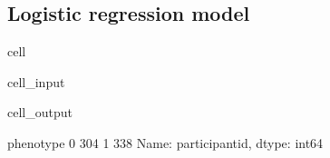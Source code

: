 \documentclass[letterpaper,10pt,english]{jupyterBook}
\begin{document}
\subsection{Logistic regression model}
\label{\detokenize{Cooper:id7}}
\begin{sphinxuseclass}{cell}\begin{sphinxVerbatimInput}

\begin{sphinxuseclass}{cell_input}
\begin{sphinxVerbatim}[commandchars=\\\{\}]
  \PYG{p}{[}\PYG{p}{]}
  \PYG{p}{[}\PYG{p}{[}\PYG{p}{]}\PYG{p}{]}
  \PYG{p}{[}\PYG{p}{]}
     
\PYG{p}{[}\PYG{p}{]}
\end{sphinxVerbatim}

\end{sphinxuseclass}\end{sphinxVerbatimInput}
\begin{sphinxVerbatimOutput}

\begin{sphinxuseclass}{cell_output}
\begin{sphinxVerbatim}[commandchars=\\\{\}]
phenotype
0    304
1    338
Name: participant\PYGZus{}id, dtype: int64
\end{sphinxVerbatim}

\end{sphinxuseclass}\end{sphinxVerbatimOutput}

\end{sphinxuseclass}
\end{document}
